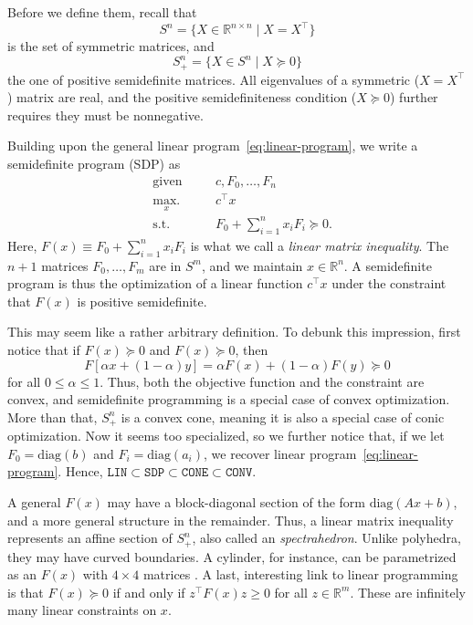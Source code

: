 			Before we define them, recall that
			$$
				S^n = \{ X \in \mathbb{R}^{n \times n} \mid X = X^\intercal \}
			$$
			is the set of symmetric matrices, and
			$$
				S_+^n = \{ X \in S^n \mid X \succeq 0 \}
			$$
			the one of positive semidefinite matrices. All eigenvalues of a symmetric ($X = X^\intercal$) matrix are real, and the positive semidefiniteness condition ($X \succeq 0$) further requires they must be nonnegative.

			Building upon the general linear program~\eqref{eq:linear-program}, we write a semidefinite program (SDP) as
			\begin{subequations}
				\begin{alignat}{2}
					&\text{given}    &\quad & c, F_0, \ldots, F_n \\
					&\underset{x}{\text{max.}}   &	  & c^\intercal x \\
					&\text{s.t.}    &      & F_0 + \sum_{i=1}^n x_i F_i \succeq 0 .
				\end{alignat}
				\label{eq:sdp}
			\end{subequations}
			Here, $F(x) \equiv F_0 + \sum_{i=1}^n x_i F_i$ is what we call a \emph{linear matrix inequality}. The $n + 1$ matrices $F_0, \ldots, F_m$ are in $S^m$, and we maintain $x \in \mathbb{R}^n$. A semidefinite program is thus the optimization of a linear function $c^\intercal x$ under the constraint that $F(x)$ is positive semidefinite.

			This may seem like a rather arbitrary definition. To debunk this impression, first notice that if $F(x) \succeq 0$ and $F(x) \succeq 0$, then
			$$
				F[ \alpha x + (1 - \alpha) y ] = \alpha F(x) + (1- \alpha) F(y) \succeq 0
			$$
			for all $0 \leq \alpha \leq 1$. Thus, both the objective function and the constraint are convex, and semidefinite programming is a special case of convex optimization. More than that, $S_+^n$ is a convex cone, meaning it is also a special case of conic optimization. Now it seems too specialized, so we further notice that, if we let $F_0 = \text{diag}(b)$ and $F_i = \text{diag}(a_i)$, we recover linear program~\eqref{eq:linear-program}. Hence, $\texttt{LIN} \subset \texttt{SDP} \subset \texttt{CONE} \subset \texttt{CONV}$.

			A general $F(x)$ may have a block-diagonal section of the form $\text{diag}(Ax + b)$, and a more general structure in the remainder. Thus, a linear matrix inequality represents an affine section of $S_+^n$, also called an \emph{spectrahedron}. Unlike polyhedra, they may have curved boundaries. A cylinder, for instance, can be parametrized as an $F(x)$ with $4 \times 4$ matrices \cite{https://www.ams.org/notices/201405/rnoti-p492.pdf}. A last, interesting link to linear programming is that $F(x) \succeq 0$ if and only if $z^\intercal F(x) z \geq 0$ for all $z \in \mathbb{R}^m$. These are infinitely many linear constraints on $x$.


